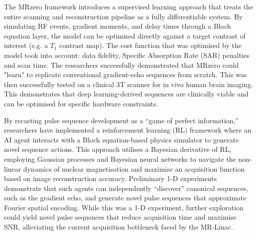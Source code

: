 The MRzero framework introduces a supervised learning approach that treats the entire scanning and reconstruction pipeline as a fully differentiable system. By simulating RF events, gradient moments, and delay times through a Bloch equation layer, the model can be optimised directly against a target contrast of interest (e.g. a $T_1$ contrast map). The cost function that was optimised by the model took into account: data fidelity, Specific Absorption Rate (SAR) penalties and scan time. The researchers successfully demonstrated that MRzero could "learn" to replicate conventional gradient-echo sequences from scratch. This was then successfully tested on a clinical 3T scanner for in vivo human brain imaging. This demonstrates that deep learning-derived sequences are clinically viable and can be optimised for specific hardware constraints.\cite{MRISeqSupLearning:21}

By recasting pulse sequence development as a ``game of perfect information,'' researchers have implemented a reinforcement learning (RL) framework where an AI agent interacts with a Bloch equation-based physics simulator to generate novel sequence actions. This approach utilises a Bayesian derivative of RL, employing Gaussian processes and Bayesian neural networks to navigate the non-linear dynamics of nuclear magnetisation and maximise an acquisition function based on image reconstruction accuracy. Preliminary 1-D experiments demonstrate that such agents can independently ``discover'' canonical sequences, such as the gradient echo, and generate novel pulse sequences that approximate Fourier spatial encoding. While this was a 1-D experiment, further exploration could yield novel pulse sequences that reduce acquisition time and maximise SNR, alleviating the current acquisition bottleneck faced by the MR-Linac.\cite{zhu2018autoseq}



